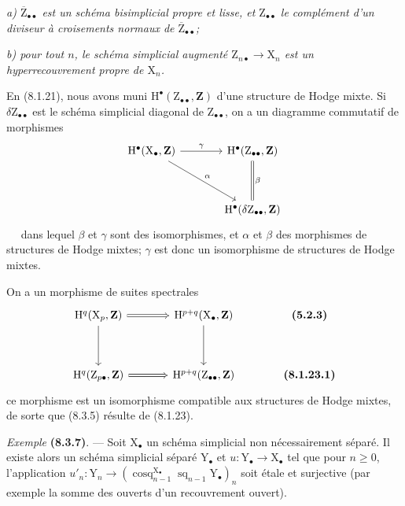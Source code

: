 \documentclass[11pt,leqno]{article}
\newcommand{\Page}[1]{\ifvmode\noindent\else\unskip\ \fi{\footnotesize\textcolor{gray}{[p.\,#1]}}\ \ignorespaces}
\begin{document}
\textit{a) \(\overline{\mathrm{Z}}_{\bullet\bullet}\) est un schéma bisimplicial propre et lisse, et \(\mathrm{Z}_{\bullet\bullet}\) le complément d’un diviseur à croisements normaux de \(\overline{\mathrm{Z}}_{\bullet\bullet}\);}

\textit{b) pour tout \(n\), le schéma simplicial augmenté \(\mathrm{Z}_{n\bullet}\to\mathrm{X}_n\) est un hyperrecouvrement propre de \(\mathrm{X}_n\).}

En (8.1.21), nous avons muni \(\mathrm{H}^\bullet(\mathrm{Z}_{\bullet\bullet},\mathbf{Z})\) d’une structure de Hodge mixte. Si \(\delta\mathrm{Z}_{\bullet\bullet}\) est le schéma simplicial diagonal de \(\mathrm{Z}_{\bullet\bullet}\), on a un diagramme commutatif de morphismes
\[
\begin{tikzcd}[column sep=large,row sep=huge]
\mathrm{H}^\bullet(\mathrm{X}_\bullet,\mathbf{Z})
  \arrow[r,"\gamma"] \arrow[dr,"\alpha"]
 & \mathrm{H}^\bullet(\mathrm{Z}_{\bullet\bullet},\mathbf{Z})
   \arrow[d,equal,"\beta"]\\
 & \mathrm{H}^\bullet(\delta\mathrm{Z}_{\bullet\bullet},\mathbf{Z})
\end{tikzcd}
\]
\Page{43}
dans lequel \(\beta\) et \(\gamma\) sont des isomorphismes, et \(\alpha\) et \(\beta\) des morphismes de structures de Hodge mixtes; \(\gamma\) est donc un isomorphisme de structures de Hodge mixtes.

On a un morphisme de suites spectrales
\[
\begin{tikzcd}[column sep=large,row sep=huge]
\mathrm{H}^q(\mathrm{X}_p,\mathbf{Z})
  \arrow[r,Rightarrow] \arrow[d]
 & \mathrm{H}^{p+q}(\mathrm{X}_\bullet,\mathbf{Z}) \arrow[d]
 & \text{\textbf{(5.2.3)}}\\
\mathrm{H}^q(\mathrm{Z}_{p\bullet},\mathbf{Z})
  \arrow[r,Rightarrow]
 & \mathrm{H}^{p+q}(\mathrm{Z}_{\bullet\bullet},\mathbf{Z})
 & \text{\textbf{(8.1.23.1)}}
\end{tikzcd}
\]
ce morphisme est un isomorphisme compatible aux structures de Hodge mixtes, de sorte que (8.3.5) résulte de (8.1.23).

\textit{Exemple} \textbf{(8.3.7)}. — Soit \(\mathrm{X}_\bullet\) un schéma simplicial non nécessairement séparé. Il existe alors un schéma simplicial séparé \(\mathrm{Y}_\bullet\) et \(u:\mathrm{Y}_\bullet\to\mathrm{X}_\bullet\) tel que pour \(n\geq0\), l’application \(u'_n:\mathrm{Y}_n\to(\operatorname{cosq}_{n-1}^{\mathrm{X}_\bullet}\operatorname{sq}_{n-1}\mathrm{Y}_\bullet)_n\) soit étale et surjective (par exemple la somme des ouverts d’un recouvrement ouvert).
\end{document}
